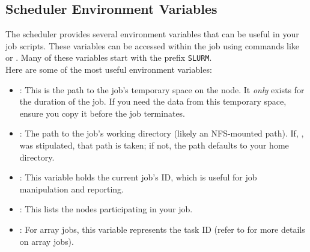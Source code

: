\documentclass{easychair}
\begin{document}
\subsection{Scheduler Environment Variables}
\label{sect:env-vars}

The scheduler provides several environment variables that can be useful in your job scripts. 
These variables can be accessed within the job using commands like  or . 
Many of these variables start with the prefix \texttt{SLURM}.\\

\noindent Here are some of the most useful environment variables:

\begin{itemize}
	\item {}:
	This is the path to the job's temporary space on the node. It \emph{only} exists for the duration of the job.
	If you need the data from this temporary space, ensure you copy it before the job terminates.

	\item {}:
	The path to the job's working directory (likely an NFS-mounted path).
	If, , was stipulated, that path is taken; if not, 
	the path defaults to your home directory.
	
	\item {}:
	This variable holds the current job's ID, which is useful for job manipulation and reporting.


	\item {}:
	This lists the nodes participating in your job.

	\item {}:
	For array jobs, this variable represents the task ID 
	(refer to  for more details on array jobs).
\end{itemize}
\end{document}
